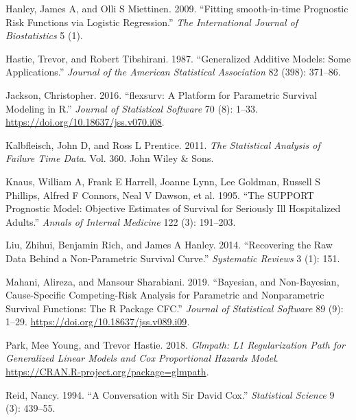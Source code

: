 \begin{CSLReferences}{1}{0}
\leavevmode{}%
Hanley, James A, and Olli S Miettinen. 2009. {``Fitting {smooth-in-time} Prognostic Risk Functions via Logistic Regression.''} \emph{The International Journal of Biostatistics} 5 (1).

\leavevmode{}%
Hastie, Trevor, and Robert Tibshirani. 1987. {``Generalized Additive Models: Some Applications.''} \emph{Journal of the American Statistical Association} 82 (398): 371--86.

\leavevmode{}%
Jackson, Christopher. 2016. {``{flexsurv}: A Platform for Parametric Survival Modeling in {R}.''} \emph{Journal of Statistical Software} 70 (8): 1--33. \url{https://doi.org/10.18637/jss.v070.i08}.

\leavevmode{}%
Kalbfleisch, John D, and Ross L Prentice. 2011. \emph{The Statistical Analysis of Failure Time Data}. Vol. 360. John Wiley \& Sons.

\leavevmode{}%
Knaus, William A, Frank E Harrell, Joanne Lynn, Lee Goldman, Russell S Phillips, Alfred F Connors, Neal V Dawson, et al. 1995. {``The SUPPORT Prognostic Model: Objective Estimates of Survival for Seriously Ill Hospitalized Adults.''} \emph{Annals of Internal Medicine} 122 (3): 191--203.

\leavevmode{}%
Liu, Zhihui, Benjamin Rich, and James A Hanley. 2014. {``Recovering the Raw Data Behind a Non-Parametric Survival Curve.''} \emph{Systematic Reviews} 3 (1): 151.

\leavevmode{}%
Mahani, Alireza, and Mansour Sharabiani. 2019. {``Bayesian, and Non-{B}ayesian, Cause-Specific Competing-Risk Analysis for Parametric and Nonparametric Survival Functions: The {R} Package {CFC}.''} \emph{Journal of Statistical Software} 89 (9): 1--29. \url{https://doi.org/10.18637/jss.v089.i09}.

\leavevmode{}%
Park, Mee Young, and Trevor Hastie. 2018. \emph{Glmpath: L1 Regularization Path for Generalized Linear Models and Cox Proportional Hazards Model}. \url{https://CRAN.R-project.org/package=glmpath}.

\leavevmode{}%
Reid, Nancy. 1994. {``A Conversation with Sir David Cox.''} \emph{Statistical Science} 9 (3): 439--55.


\end{CSLReferences}
